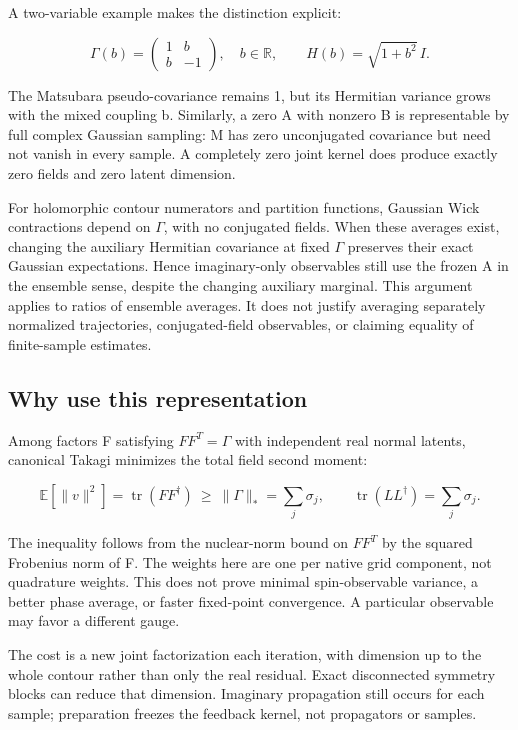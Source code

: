 \documentclass[11pt,a4paper]{article}
\begin{document}
A two-variable example makes the distinction explicit:

\[
\Gamma(b)=\begin{pmatrix}1&b\\b&-1\end{pmatrix},\quad b\in\mathbb R,
\qquad
H(b)=\sqrt{1+b^2}\,I.
\]

The Matsubara pseudo-covariance remains 1, but its Hermitian variance grows with the mixed coupling b. Similarly, a zero A with nonzero B is representable by full complex Gaussian sampling: M has zero unconjugated covariance but need not vanish in every sample. A completely zero joint kernel does produce exactly zero fields and zero latent dimension.

For holomorphic contour numerators and partition functions, Gaussian Wick contractions depend on \(\Gamma\), with no conjugated fields. When these averages exist, changing the auxiliary Hermitian covariance at fixed \(\Gamma\) preserves their exact Gaussian expectations. Hence imaginary-only observables still use the frozen A in the ensemble sense, despite the changing auxiliary marginal. This argument applies to ratios of ensemble averages. It does not justify averaging separately normalized trajectories, conjugated-field observables, or claiming equality of finite-sample estimates.

\subsection{Why use this representation}

Among factors F satisfying \(FF^T=\Gamma\) with independent real normal latents, canonical Takagi minimizes the total field second moment:

\[
\mathbb E[\|v\|^2]=\operatorname{tr}(FF^\dagger)
\ \geq\ \|\Gamma\|_* =\sum_j\sigma_j,
\qquad
\operatorname{tr}(L L^\dagger)=\sum_j\sigma_j.
\]

The inequality follows from the nuclear-norm bound on \(FF^T\) by the squared Frobenius norm of F. The weights here are one per native grid component, not quadrature weights. This does not prove minimal spin-observable variance, a better phase average, or faster fixed-point convergence. A particular observable may favor a different gauge.

The cost is a new joint factorization each iteration, with dimension up to the whole contour rather than only the real residual. Exact disconnected symmetry blocks can reduce that dimension. Imaginary propagation still occurs for each sample; preparation freezes the feedback kernel, not propagators or samples.
\end{document}
